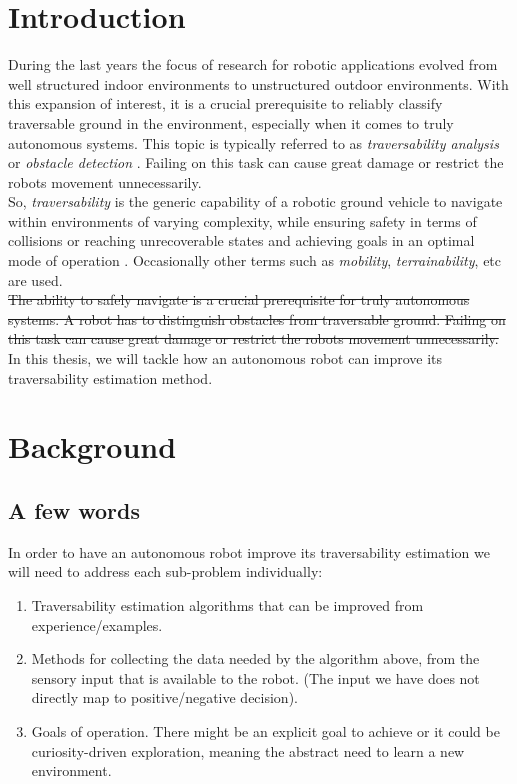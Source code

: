 \documentclass[12pt,a4paper]{report}
\newcommand{\term}{\textit}
\begin{document}
	{
		\hypersetup{linkcolor=black}
		\tableofcontents
	}
	
	\chapter{Introduction}
	\label{sec:intro}
	
	During the last years the focus of research for robotic applications evolved 
	from well structured indoor environments to unstructured outdoor environments. 
	With this expansion of interest, it is a crucial prerequisite to reliably 
	classify traversable ground in the environment, especially when it comes to 
	truly autonomous systems. This topic is typically referred to as 
	\term{traversability analysis} or \term{obstacle detection} \cite{Suger}. 
	Failing on this	task can cause great damage or restrict the robots movement 
	unnecessarily.
	\\
	
	So, \term{traversability} is the generic capability of a robotic ground 
	vehicle to navigate within environments of varying complexity, while ensuring 
	safety in terms of collisions or reaching unrecoverable states and achieving 
	goals in an optimal mode of operation \cite{Papadakis}. Occasionally other 
	terms such as \term{mobility}, \term{terrainability}, etc are used.
	\\
	
	\sout{The ability to safely navigate is a crucial prerequisite for truly 
	autonomous systems. A robot has to distinguish obstacles from traversable 
	ground. Failing on this	task can cause great damage or restrict the robots 
	movement unnecessarily.}
	\\
	
	In this thesis, we will tackle how an autonomous robot can improve its 
	traversability estimation method.
	
	\chapter{Background}
	\label{sec:bg}
	
	\section{A few words}
	\label{sec:bg:intro}
	
	In order to have an autonomous robot improve its traversability 
	estimation we will need to address each sub-problem individually:
	
	\begin{enumerate}
		\item Traversability estimation algorithms that can be improved from 
		experience/examples.
		\item Methods for collecting the data needed by the algorithm above, from 
		the sensory input that is available to the robot. (The input we have does not 
		directly map to positive/negative decision).
		\item Goals of operation. There might be an explicit goal to achieve or it 
		could be curiosity-driven exploration, meaning the abstract need to learn a 
		new environment.
	\end{enumerate}
	
\end{document}
